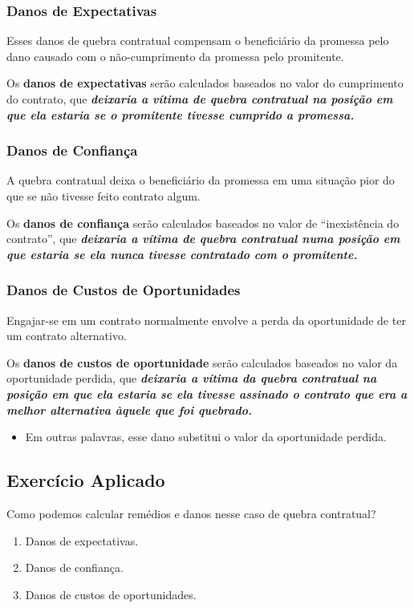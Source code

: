 \documentclass[a4paper,12pt]{article}[abntex2]
\begin{document}
\subsubsection{\textbf{Danos de Expectativas}}
Esses danos de quebra contratual compensam o beneficiário da promessa pelo dano causado com o não-cumprimento da promessa pelo promitente. 

Os\textbf{ danos de expectativas} serão calculados baseados no valor do cumprimento do contrato, que\textbf{\textit{ deixaria a vítima de quebra contratual na posição em que ela estaria se o promitente tivesse cumprido a promessa.}}

\subsubsection{\textbf{Danos de Confiança}}
A quebra contratual deixa o beneficiário da promessa em uma situação pior do que se não tivesse feito contrato algum. 

Os \textbf{danos de confiança} serão calculados baseados no valor de “inexistência do contrato”, que \textbf{\textit{deixaria a vítima de quebra contratual numa posição em que estaria se ela nunca tivesse contratado com o promitente.}}

\subsubsection{\textbf{Danos de Custos de Oportunidades}}
Engajar-se em um contrato normalmente envolve a perda da oportunidade de ter um contrato alternativo. 

Os \textbf{danos de custos de oportunidade} serão calculados baseados no valor da oportunidade perdida, que \textit{\textbf{deixaria a vítima da quebra contratual na posição em que ela estaria se ela tivesse assinado o contrato que era a melhor alternativa àquele que foi quebrado.}} \begin{itemize}
    \item Em outras palavras, esse dano substitui o valor da oportunidade perdida.
\end{itemize}

\subsection{\textbf{Exercício Aplicado}}
Como podemos calcular remédios e danos nesse caso de quebra contratual?\begin{enumerate}
   \item Danos de expectativas.
   \item Danos de confiança.
   \item Danos de custos de oportunidades.
\end{enumerate}
\end{document}

